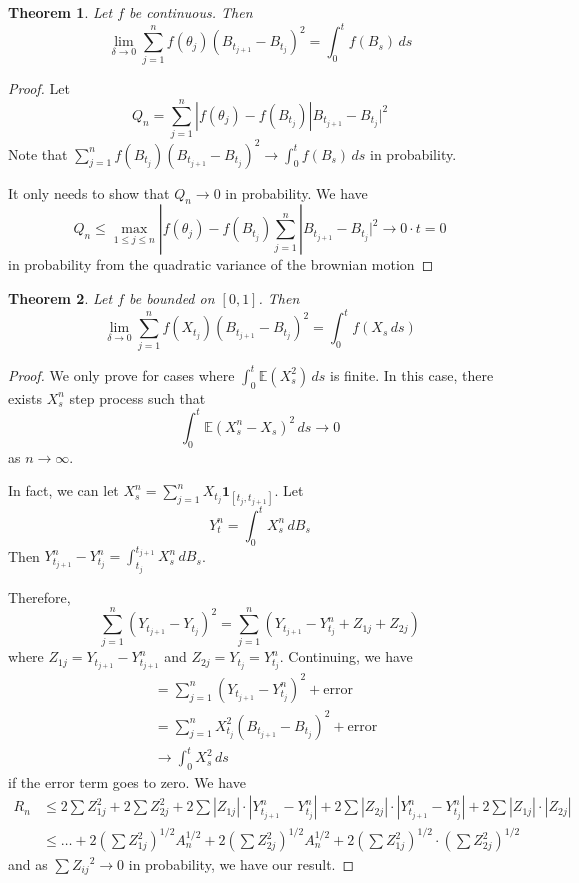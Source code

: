 \documentclass[10pt, oneside, reqno]{amsart}
\theoremstyle{plain}%
\newtheorem{thm}{Theorem}[section]
\theoremstyle{definition}
\theoremstyle{remark}
\newcommand{\E}{\mathbb{E}}
\begin{document}
\begin{thm}
    Let $f$ be continuous.  Then \[
        \lim_{\delta \rightarrow 0 } \sum_{j=1}^n f(\theta_j) (B_{t_{j+1}} - B_{t_j})^2 = \int_0^t f(B_s) \, ds
    \]
\end{thm}
\begin{proof}
    Let \[
        Q_n = \sum_{j=1}^n |f(\theta_j)  - f(B_{t_j}) |B_{t_{j+1}} - B_{t_j}|^2  
    \]
    Note that $\sum_{j=1}^n f(B_{t_j}) (B_{t_{j+1}} - B_{t_j})^2 \rightarrow \int_0^t f(B_s) \, ds$ in probability.  
    
    It only needs to show that $Q_n \rightarrow 0$ in probability.   We have \[
        Q_n \leq \max_{1 \leq j \leq n} | f(\theta_j) - f(B_{t_j})\sum_{j=1}^n |B_{t_{j+1}} - B_{t_j}|^2 \rightarrow 0 \cdot t = 0
    \] in probability from the quadratic variance of the brownian motion 
\end{proof}


\begin{thm}
    Let $f$ be bounded on $[0,1]$.  Then \[
        \lim_{\delta \rightarrow 0} \sum_{j=1}^n f(X_{t_j})(B_{t_{j+1}} - B_{t_j})^2 = \int_0^t f(X_s \, ds)
    \]
\end{thm}
\begin{proof}
    We only prove for cases where $\int_0^t \E(X_s^2) \, ds$ is finite.  In this case, there exists $X_s^n$ step process such that \[
        \int_0^t \E(X_s^n - X_s)^2 \, ds \rightarrow 0
    \] as $n \rightarrow \infty$.  
    
    In fact, we can let $X_s^n = \sum_{j=1}^n X_{t_j}  \mathbf{1}_{[t_j, t_{j+1}]}$.  Let \[
        Y_t^n = \int_0^t X_s^n \, dB_s
    \]  Then $Y_{t_{j+1}}^n - Y_{t_j}^n = \int_{t_j}^{t_{j+1}} X_s^n \, dB_s$.  

    Therefore, \[
        \sum_{j=1}^n (Y_{t_{j+1}} - Y_{t_j})^2 = \sum_{j=1}^n (Y_{t_{j+1}} - Y^n_{t_{j}} + Z_{1j} + Z_{2j} )
    \] where $Z_{1j} = Y_{t_{j+1}} - Y_{t_{j+1}}^n$ and $Z_{2j} = Y_{t_j} = Y_{t_{j}}^n$.  Continuing, we have \begin{align*}
        &= \sum_{j=1}^n (Y_{t_{j+1}} - Y_{t_{j}}^n)^2 + \text{error} \\
        &= \sum_{j=1}^n X_{t_j}^2 (B_{t_{j+1}} - B_{t_j})^2 + \text{error} \\
        &\rightarrow \int_0^t X_s^2 \, ds
    \end{align*} if the error term goes to zero.  We have \begin{align*}
        R_n &\leq 2 \sum Z_{1j}^2 + 2 \sum Z_{2j}^2 + 2 \sum |Z_{1j} | \cdot | Y_{t_{j+1}}^n - Y_{t_j}^n | + 2 \sum |Z_{2j} | \cdot | Y_{t_{j+1}}^n - Y_{t_j}^n | + 2 \sum |Z_{1j} | \cdot |Z_{2j} | \\
        &\leq \dots + 2 (\sum Z_{1j}^2 )^{1/2} A_n^{1/2} + 2 (\sum Z_{2j}^2 )^{1/2} A_n^{1/2} + 2  (\sum Z_{1j}^2 )^{1/2} \cdot  (\sum Z_{2j}^2 )^{1/2} 
    \end{align*}
    and as $\sum {Z_{ij}}^2 \rightarrow 0$ in probability, we have our result.
\end{proof}
\end{document}
